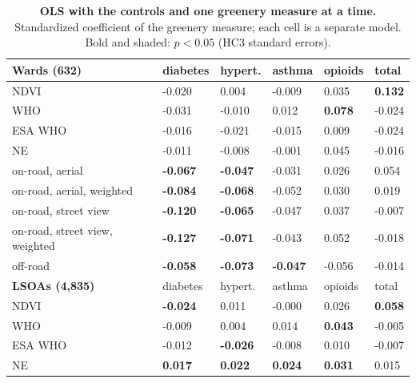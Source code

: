 \begin{table}[hbt!]
\caption{\textbf{OLS with the controls and one greenery measure at a time.} Standardized coefficient of the greenery measure; each cell is a separate model. Bold and shaded: $p<0.05$ (HC3 standard errors).}\label{ols_greenery}
\centering\footnotesize\setlength{\tabcolsep}{4pt}
\begin{tabular}{l*{5}{l}}
\toprule
\textbf{Wards (632)} & diabetes & hypert. & asthma & opioids & total \\
\midrule
NDVI & -0.020 & \phantom{-}0.004 & -0.009 & \phantom{-}0.035 & \cellcolor{poscell}\textbf{\phantom{-}0.132} \\
WHO & -0.031 & -0.010 & \phantom{-}0.012 & \cellcolor{poscell}\textbf{\phantom{-}0.078} & -0.024 \\
ESA WHO & -0.016 & -0.021 & -0.015 & \phantom{-}0.009 & -0.024 \\
NE & -0.011 & -0.008 & -0.001 & \phantom{-}0.045 & -0.016 \\
\midrule
on-road, aerial & \cellcolor{negcell}\textbf{-0.067} & \cellcolor{negcell}\textbf{-0.047} & -0.031 & \phantom{-}0.026 & \phantom{-}0.054 \\
on-road, aerial, weighted & \cellcolor{negcell}\textbf{-0.084} & \cellcolor{negcell}\textbf{-0.068} & -0.052 & \phantom{-}0.030 & \phantom{-}0.019 \\
on-road, street view & \cellcolor{negcell}\textbf{-0.120} & \cellcolor{negcell}\textbf{-0.065} & -0.047 & \phantom{-}0.037 & -0.007 \\
on-road, street view, weighted & \cellcolor{negcell}\textbf{-0.127} & \cellcolor{negcell}\textbf{-0.071} & -0.043 & \phantom{-}0.052 & -0.018 \\
off-road & \cellcolor{negcell}\textbf{-0.058} & \cellcolor{negcell}\textbf{-0.073} & \cellcolor{negcell}\textbf{-0.047} & -0.056 & -0.014 \\
\midrule[\heavyrulewidth]
\textbf{LSOAs (4,835)} & diabetes & hypert. & asthma & opioids & total \\
\midrule
NDVI & \cellcolor{negcell}\textbf{-0.024} & \phantom{-}0.011 & -0.000 & \phantom{-}0.026 & \cellcolor{poscell}\textbf{\phantom{-}0.058} \\
WHO & -0.009 & \phantom{-}0.004 & \phantom{-}0.014 & \cellcolor{poscell}\textbf{\phantom{-}0.043} & -0.005 \\
ESA WHO & -0.012 & \cellcolor{negcell}\textbf{-0.026} & -0.008 & \phantom{-}0.010 & -0.007 \\
NE & \cellcolor{poscell}\textbf{\phantom{-}0.017} & \cellcolor{poscell}\textbf{\phantom{-}0.022} & \cellcolor{poscell}\textbf{\phantom{-}0.024} & \cellcolor{poscell}\textbf{\phantom{-}0.031} & \phantom{-}0.015 \\

\end{tabular}
\end{table}
